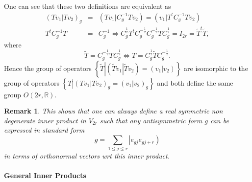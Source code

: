 \documentclass[aps,preprint]{revtex4}
\newtheorem{remark}[theorem]{Remark}
\begin{document}
One can see that these two definitions are equivalent as 
\begin{eqnarray}
\left( \left. Tv_{1}\right\vert Tv_{2}\right) _{g} &=&\left( \left.
Tv_{1}\right\vert C_{g}^{-1}Tv_{2}\right) =\left( \left. v_{1}\right\vert
T^{t}C_{g}^{-1}Tv_{2}\right) \\
T^{t}C_{g}^{-1}T &=&C_{g}^{-1}\Leftrightarrow C_{g}^{\frac{1}{2}%
}T^{t}C_{g}^{-\frac{1}{2}}C_{g}^{-\frac{1}{2}}TC_{g}^{\frac{1}{2}}=I_{2r}=%
\widetilde{T}^{t}\widetilde{T},
\end{eqnarray}%
where 
\begin{equation}
\widetilde{T}=C_{g}^{-\frac{1}{2}}TC_{g}^{\frac{1}{2}}\Leftrightarrow
T=C_{g}^{\frac{1}{2}}\widetilde{T}C_{g}^{-\frac{1}{2}}.
\end{equation}%
Hence the group of operators $\left\{ \left. \overset{}{\widetilde{T}}%
\right\vert \left( \left. \widetilde{T}v_{1}\right\vert \widetilde{T}%
v_{2}\right) =\left( \left. v_{1}\right\vert v_{2}\right) \right\} $ are
isomorphic to the group of operators $\left\{ \left. \overset{}{T}%
\right\vert \left( \left. Tv_{1}\right\vert Tv_{2}\right) _{g}=\left( \left.
v_{1}\right\vert v_{2}\right) _{g}\right\} $ and both define the same group $%
O\left( 2r,\mathbb{R}\right) .$

\begin{remark}
This shows that one can always define a real symmetric non degenerate inner
product in $V_{2r}$ such that any antisymmetric form $g$ can be expressed in
standard form 
\begin{equation}
g=\sum\limits_{1\leq j\leq r}\left\vert e_{gj}e_{gj+r}\right)
\end{equation}%
in terms of orthonormal vectors wrt this inner product.
\end{remark}

\paragraph{General Inner Products}
\end{document}
